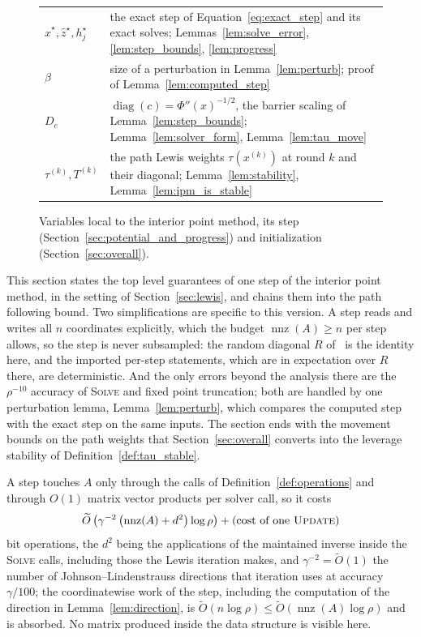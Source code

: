 \documentclass[11pt]{article}
\newcommand{\diag}{\operatorname{diag}}
\newcommand{\nnz}{\operatorname{nnz}}
\renewcommand{\O}{\widetilde O}
\newcommand{\xhat}{\widehat{x}}
\newcommand{\zhat}{\widehat{z}}
\begin{document}
\begin{figure}[H]
\begin{center}
\begin{tabular}{@{}lp{}@{}}
$\xhat^\star,\zhat^\star,h_j^\star$ & the exact step of Equation~\eqref{eq:exact_step} and its exact solves; Lemmas~\ref{lem:solve_error}, \ref{lem:step_bounds}, \ref{lem:progress} \\
$\beta$ & size of a perturbation in Lemma~\ref{lem:perturb}; proof of Lemma~\ref{lem:computed_step} \\
$D_c$ & $\diag(c) = \Phi''(x)^{-1/2}$, the barrier scaling of Lemma~\ref{lem:step_bounds}; Lemma~\ref{lem:solver_form}, Lemma~\ref{lem:tau_move} \\
$\tau^{(k)}, T^{(k)}$ & the path Lewis weights $\tau(x^{(k)})$ at round $k$ and their diagonal; Lemma~\ref{lem:stability}, Lemma~\ref{lem:ipm_is_stable} \\
\bottomrule
\end{tabular}
\end{center}
\caption{Variables local to the interior point method, its step
(Section~\ref{sec:potential_and_progress}) and initialization
(Section~\ref{sec:overall}).}
\label{fig:notation_ipm}
\end{figure}

This section states the top level guarantees of one step of the interior point
method, in the setting of Section~\ref{sec:lewis}, and chains them into the path
following bound.
Two simplifications are specific to this version.
A step reads and writes all $n$ coordinates explicitly, which the budget
$\nnz(A) \ge n$ per step allows, so the step is never subsampled: the random
diagonal $R$ of~\cite{BLLSSSW21} is the
identity here, and the imported per-step statements, which are in expectation
over $R$ there, are deterministic.
And the only errors beyond the analysis there are the $\rho^{-10}$ accuracy of
\textsc{Solve} and fixed point truncation; both are handled by one perturbation
lemma, Lemma~\ref{lem:perturb}, which compares the computed step with the exact
step on the same inputs.
The section ends with the movement bounds on the path weights that
Section~\ref{sec:overall} converts into the leverage stability of
Definition~\ref{def:tau_stable}.

A step touches $A$ only through the calls of Definition~\ref{def:operations} and
through $O(1)$ matrix vector products per solver call, so it costs
\[
\O\left( \gamma^{-2} \left( \nnz(A) + d^{2} \right) \log \rho \right)
+ \left( \text{cost of one \textsc{Update}} \right)
\]
bit operations, the $d^{2}$ being the applications of the maintained inverse
inside the \textsc{Solve} calls, including those the Lewis iteration makes, and
$\gamma^{-2} = \O(1)$ the number of Johnson--Lindenstrauss directions that
iteration uses at accuracy $\gamma / 100$; the coordinatewise work of the step,
including the computation of the direction in Lemma~\ref{lem:direction}, is
$\O(n \log \rho) \le \O(\nnz(A) \log \rho)$ and is absorbed.
No matrix produced inside the data structure is visible here.
\end{document}
